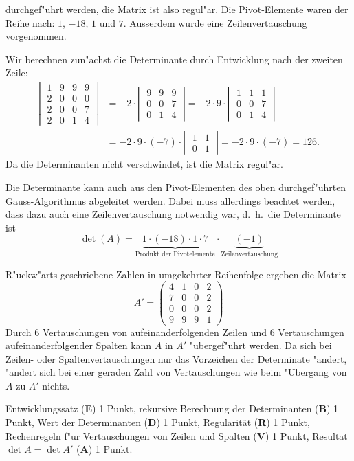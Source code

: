 \begin{loesung}
\begin{teilaufgaben}
durchgef"uhrt werden, die Matrix ist also regul"ar. Die Pivot-Elemente
waren der Reihe nach: $1$, $-18$, $1$ und $7$.
Ausserdem wurde eine Zeilenvertauschung vorgenommen.
\item
Wir berechnen zun"achst die Determinante durch Entwicklung
nach der zweiten Zeile:
\begin{align*}
\left|\;
\begin{matrix}
1&9&9&9\\
2&0&0&0\\
2&0&0&7\\
2&0&1&4
\end{matrix}
\;\right|
&=
-2\cdot
\left|\;\begin{matrix}
9&9&9\\
0&0&7\\
0&1&4
\end{matrix}\;\right|
=-2\cdot 9\cdot
\left|\;\begin{matrix}
1&1&1\\
0&0&7\\
0&1&4
\end{matrix}\;\right|
\\
&=
-2\cdot 9\cdot(-7)\cdot
\left|\;\begin{matrix}
1&1\\
0&1
\end{matrix}\;\right|
=
-2\cdot 9\cdot(-7)=126.
\end{align*}
Da die Determinanten nicht verschwindet, ist die Matrix regul"ar.

Die Determinante kann auch aus den Pivot-Elementen des oben durchgef"uhrten
Gauss-Algorithmus abgeleitet werden. Dabei muss allerdings beachtet werden,
dass dazu auch eine Zeilenvertauschung notwendig war, d.~h.~die Determinante
ist 
\[
\det(A)=\underbrace{1\cdot (-18)\cdot 1\cdot 7}_{\text{Produkt der Pivotelemente}}\cdot \underbrace{(-1)}_{\text{Zeilenvertauschung}}
\]
\item R"uckw"arts geschriebene Zahlen in umgekehrter Reihenfolge 
ergeben die Matrix
\[
A'=\begin{pmatrix}
4&1&0&2\\
7&0&0&2\\
0&0&0&2\\
9&9&9&1
\end{pmatrix}
\]
Durch 6 Vertauschungen von aufeinanderfolgenden Zeilen und 6
Vertauschungen aufeinanderfolgender Spalten kann $A$ in $A'$
"ubergef"uhrt werden. Da sich bei Zeilen- oder Spaltenvertauschungen
nur das Vorzeichen der Determinate "andert, "andert sich bei
einer geraden Zahl von Vertauschungen wie beim "Ubergang von $A$
zu $A'$ nichts.
\end{teilaufgaben}
\end{loesung}

\begin{bewertung}
Entwicklungssatz ({\bf E}) 1 Punkt,
rekursive Berechnung der Determinanten ({\bf B}) 1 Punkt,
Wert der Determinanten ({\bf D}) 1 Punkt,
Regularit\"at ({\bf R}) 1 Punkt, 
Rechenregeln f"ur Vertauschungen von Zeilen und Spalten ({\bf V}) 1 Punkt,
Resultat $\det A=\det A'$ ({\bf A}) 1 Punkt.
\end{bewertung}




